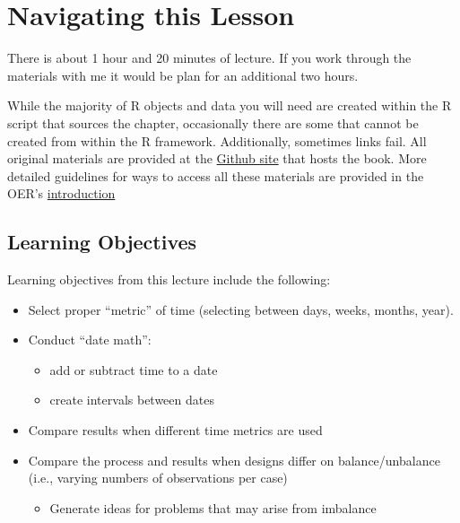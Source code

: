 \documentclass[
  english,
]{book}
\providecommand{\tightlist}{%
  \setlength{\itemsep}{0pt}\setlength{\parskip}{0pt}}
\begin{document}
\hypertarget{navigating-this-lesson-3}{%
\section{Navigating this Lesson}\label{navigating-this-lesson-3}}

There is about 1 hour and 20 minutes of lecture. If you work through the materials with me it would be plan for an additional two hours.

While the majority of R objects and data you will need are created within the R script that sources the chapter, occasionally there are some that cannot be created from within the R framework. Additionally, sometimes links fail. All original materials are provided at the \href{https://github.com/lhbikos/ReC_CPA}{Github site} that hosts the book. More detailed guidelines for ways to access all these materials are provided in the OER's \protect\hyperlink{ReCintro}{introduction}

\hypertarget{learning-objectives-3}{%
\subsection{Learning Objectives}\label{learning-objectives-3}}

Learning objectives from this lecture include the following:

\begin{itemize}
\tightlist
\item
  Select proper ``metric'' of time (selecting between days, weeks, months, year).
\item
  Conduct ``date math'':

  \begin{itemize}
  \tightlist
  \item
    add or subtract time to a date
  \item
    create intervals between dates
  \end{itemize}
\item
  Compare results when different time metrics are used
\item
  Compare the process and results when designs differ on balance/unbalance (i.e., varying numbers of observations per case)

  \begin{itemize}
  \tightlist
  \item
    Generate ideas for problems that may arise from imbalance
  \end{itemize}
\end{itemize}
\end{document}
